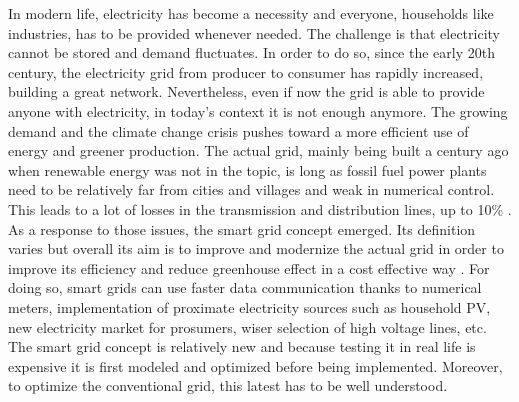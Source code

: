 
In modern life, electricity has become a necessity and everyone, households like industries, has to be provided whenever needed. The challenge is that electricity cannot be stored and demand fluctuates. In order to do so, since the early 20th century, the electricity grid from producer to consumer has rapidly increased, building a great network. Nevertheless, even if now the grid is able to provide anyone with electricity, in today's context it is not enough anymore. The growing demand and the climate change crisis pushes toward a more efficient use of energy and greener production. The actual grid, mainly being built a century ago when renewable energy was not in the topic, is long as fossil fuel power plants need to be relatively far from cities and villages and weak in numerical control. This leads to a lot of losses in the transmission and distribution lines, up to 10\% \cite{councileu}. As a response to those issues, the smart grid concept emerged. Its definition varies but overall its aim is to improve and modernize the actual grid in order to improve its efficiency and reduce greenhouse effect in a cost effective way \cite{ahat2013smart}. For doing so, smart grids can use faster data communication thanks to numerical meters, implementation of proximate electricity sources such as household PV, new electricity market for prosumers, wiser selection of high voltage lines, etc. The smart grid concept is relatively new and because testing it in real life is expensive it is first modeled and optimized before being implemented. Moreover, to optimize the conventional grid, this latest has to be well understood.

